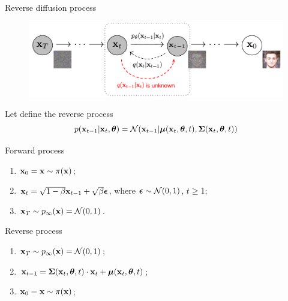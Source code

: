 \begin{frame}{Reverse diffusion process}
	\begin{figure}
		\includegraphics[width=0.8\linewidth]{figs/DDPM}
	\end{figure}
	Let define the reverse process
	\vspace{-0.2cm}
	\[
		p(\mathbf{x}_{t - 1} | \mathbf{x}_t, \boldsymbol{\theta}) = \mathcal{N}(\mathbf{x}_{t - 1} | \boldsymbol{\mu}(\mathbf{x}_t, \boldsymbol{\theta}, t), \boldsymbol{\Sigma}(\mathbf{x}_t, \boldsymbol{\theta}, t))
	\]
	\vspace{-0.5cm}
	\begin{minipage}{0.5\linewidth}
		\begin{block}{Forward process}
			\begin{enumerate}
				\item $\mathbf{x}_0 = \mathbf{x} \sim \pi(\mathbf{x})$;
				\item $\mathbf{x}_t = \sqrt{1 - \beta} \mathbf{x}_{t - 1} + \sqrt{\beta} \boldsymbol{\epsilon}$, where $\boldsymbol{\epsilon} \sim \mathcal{N}(0, 1)$, $t \geq 1$;
				\item $\mathbf{x}_T \sim p_{\infty}(\mathbf{x}) = \mathcal{N}(0, 1)$.
			\end{enumerate}
		\end{block}
	\end{minipage}%
	\begin{minipage}{0.5\linewidth}
		\begin{block}{Reverse process}
			\begin{enumerate}
				\item $\mathbf{x}_T \sim p_{\infty}(\mathbf{x}) = \mathcal{N}(0, 1)$;
				\item $\mathbf{x}_{t - 1} = \boldsymbol{\Sigma}(\mathbf{x}_t, \boldsymbol{\theta}, t) \cdot \mathbf{x}_t + \boldsymbol{\mu}(\mathbf{x}_t, \boldsymbol{\theta}, t)$;
				\item $\mathbf{x}_0 = \mathbf{x} \sim \pi(\mathbf{x})$;
			\end{enumerate}
		\end{block}
	\end{minipage}
\end{frame}
